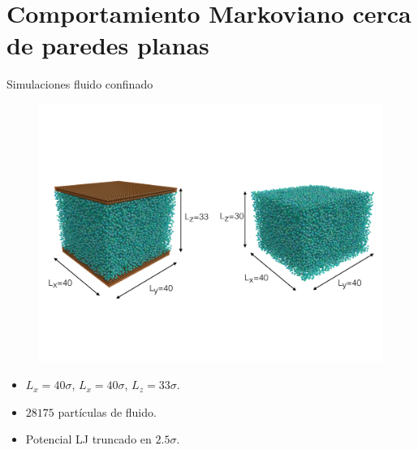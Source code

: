 \documentclass{beamer}
\begin{document}
\section{Comportamiento Markoviano cerca de paredes planas}

\begin{frame}{Simulaciones fluido confinado}
\begin{figure}
    \centering
    \includegraphics[width=0.8\linewidth]{dim-sim-pbc-walls}
\end{figure}
    \begin{itemize}
      \item $L_x=40\sigma$, $L_x=40\sigma$, $L_z=33\sigma$.
     \item $28175$ partículas de fluido. 
     \item Potencial LJ truncado en $2.5\sigma$.
    \end{itemize}
\end{frame}
\end{document}
